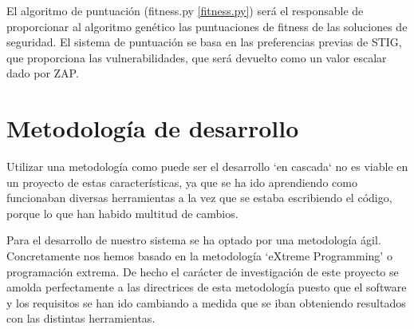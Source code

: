 \bigskip
El algoritmo de puntuación (fitness.py \ref{fitness.py}) será el responsable de proporcionar al algoritmo genético las puntuaciones de fitness de las soluciones de seguridad. El sistema de puntuación se basa en las preferencias previas de STIG, que proporciona las vulnerabilidades, que será devuelto como un valor escalar dado por ZAP.

\section{Metodología de desarrollo}

Utilizar una metodología como puede ser el desarrollo `en cascada` no es viable en un proyecto de estas características, ya que se ha ido aprendiendo como funcionaban diversas herramientas a la vez que se estaba escribiendo el código, porque lo que han habido multitud de cambios.

\bigskip
Para el desarrollo de nuestro sistema se ha optado por una metodología ágil. Concretamente nos hemos basado en la metodología `eXtreme Programming' o programación extrema. De hecho el carácter de investigación de este proyecto se amolda perfectamente a las directrices de esta metodología puesto que el software y los requisitos se han ido cambiando a medida que se iban obteniendo resultados con las distintas herramientas. 



